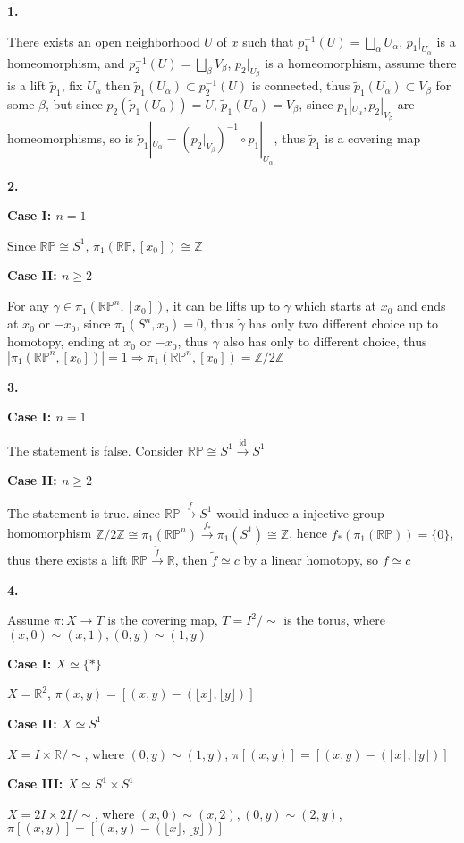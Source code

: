 \documentclass[../main.tex]{subfiles}
\begin{document}
\textbf{1.} \par
There exists an open neighborhood $U$ of $x$ such that $p_{1}^{-1}(U)=\displaystyle\bigsqcup_{\alpha}U_{\alpha}$, $p_{1}|_{U_{\alpha}}$ is a homeomorphism, and $p_{2}^{-1}(U)=\displaystyle\bigsqcup_{\beta}V_{\beta}$, $p_{2}|_{U_{\beta}}$ is a homeomorphism, assume there is a lift $\widetilde{p}_{1}$, fix $U_{\alpha}$ then $\widetilde{p}_{1}(U_{\alpha})\subset p_{2}^{-1}(U)$ is connected, thus $\widetilde{p}_{1}(U_{\alpha})\subset V_{\beta}$ for some $\beta$, but since $p_{2}\left(\widetilde{p}_{1}(U_{\alpha})\right)=U$, $\widetilde{p}_{1}(U_{\alpha})=V_{\beta}$, since $p_{1}|_{U_{\alpha}},p_{2}|_{V_{\beta}}$ are homeomorphisms, so is $\widetilde{p}_{1}|_{U_{\alpha}}=\left(p_{2}|_{V_{\beta}}\right)^{-1}\circ p_{1}|_{U_{\alpha}}$, thus $\widetilde{p}_{1}$ is a covering map \par
\textbf{2.} \par
\textbf{Case I: $n=1$} \par
Since $\mathbb{RP}\cong S^{1}$, $\pi_{1}(\mathbb{RP},[x_{0}])\cong\mathbb{Z}$ \par
\textbf{Case II: $n\geq 2$} \par
For any $\gamma\in\pi_{1}(\mathbb{RP}^{n},[x_{0}])$, it can be lifts up to $\widetilde{\gamma}$ which starts at $x_{0}$ and ends at $x_{0}$ or $-x_{0}$, since $\pi_{1}(S^{n},x_{0})=0$, thus $\widetilde{\gamma}$ has only two different choice up to homotopy, ending at $x_{0}$ or $-x_{0}$, thus $\gamma$ also has only to different choice, thus $|\pi_{1}(\mathbb{RP}^{n},[x_{0}])|=1 \Rightarrow\pi_{1}(\mathbb{RP}^{n},[x_{0}])=\mathbb{Z}/2\mathbb{Z}$ \par
\textbf{3.} \par
\textbf{Case I: $n=1$} \par
The statement is false. Consider $\mathbb{RP}\cong S^{1}\xrightarrow{\mathrm{id}}S^{1}$ \par
\textbf{Case II: $n\geq 2$} \par
The statement is true. since $\mathbb{RP}\xrightarrow{f}S^{1}$ would induce a injective group homomorphism $\mathbb{Z}/2\mathbb{Z}\cong\pi_{1}(\mathbb{RP}^{n})\xrightarrow{f_{*}}\pi_1(S^1)\cong\mathbb{Z}$, hence $f_*(\pi_1(\mathbb{RP}))=\{0\}$, thus there exists a lift $\mathbb{RP}\xrightarrow{\widetilde{f}}\mathbb{R}$, then $\widetilde{f}\simeq c$ by a linear homotopy, so $f\simeq c$ \par
\textbf{4.} \par
Assume $\pi: X\rightarrow T$ is the covering map, $T=I^{2}/\sim$ is the torus, where $(x,0)\sim(x,1),(0,y)\sim(1,y)$ \par
\textbf{Case I: $X\simeq \{*\}$} \par
$X=\mathbb{R}^{2}$, $\pi(x,y)=\left[(x,y)-(\lfloor x\rfloor,\lfloor y\rfloor)\right]$ \par
\textbf{Case II: $X\simeq S^{1}$} \par
$X=I\times\mathbb{R}/\sim$, where $(0,y)\sim(1,y)$, $\pi[(x,y)]=\left[(x,y)-(\lfloor x\rfloor,\lfloor y\rfloor)\right]$ \par
\textbf{Case III: $X\simeq S^{1}\times S^{1}$} \par
$X=2I\times 2I/\sim$, where $(x,0)\sim(x,2), (0,y)\sim(2,y)$, $\pi[(x,y)]=\left[(x,y)-(\lfloor x\rfloor,\lfloor y\rfloor)\right]$ \par
\end{document}
